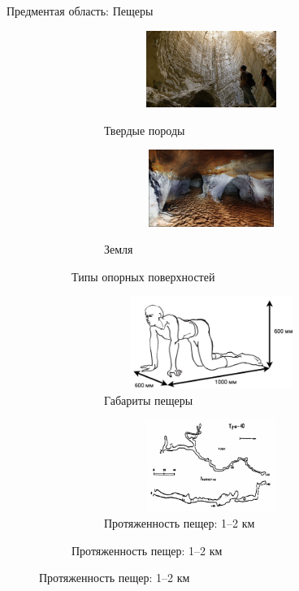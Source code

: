 \documentclass[aspectratio=169,xcolor=table,10pt]{beamer}
\begin{document}
\begin{frame}[t]{Предментая область: Пещеры}
\begin{figure}[H]
\begin{subfigure}{0.49\textwidth}
            \begin{subfigure}[b]{0.49\textwidth}
                \centering\includegraphics[height=2.5cm,width=1\textwidth,keepaspectratio]{surface_types/salt.jpg}\\
                \caption{Твердые породы}
            \end{subfigure}
            \begin{subfigure}[b]{0.49\textwidth}
                \centering\includegraphics[height=2.5cm,width=1\textwidth,keepaspectratio]{surface_types/sand.jpg}\\
                \caption{Земля}
            \end{subfigure}
            \caption*{Типы опорных поверхностей}
        \end{subfigure}
        \begin{subfigure}{0.49\textwidth}
            \begin{subfigure}{0.99\textwidth}
                \centering\includegraphics[height=3cm,width=1\textwidth,keepaspectratio]{../images/human_crawling.png}
                \caption*{Габариты пещеры}
            \end{subfigure}

            \begin{subfigure}{0.99\textwidth}
                \centering\includegraphics[height=3cm,width=1\textwidth,keepaspectratio]{../images/cave_maps/map3.png}
                \caption*{Протяженность пещер: 1--2 км}
            \end{subfigure}
        \end{subfigure}
    \end{figure}
\end{frame}
\end{document}
